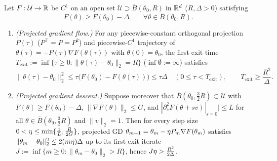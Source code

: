 \begin{lemma}
\label{lem:energy-barrier}
\label{rem:flow}
Let $F : \mathcal U \to \mathbb R$ be $C^1$ on an open set $\mathcal U \supset \bar B(\theta_0, R)$ in $\mathbb R^d$ ($R, \Delta > 0$) satisfying
\[
  F(\theta) \ge F(\theta_0) - \Delta \qquad \forall \theta \in \bar B(\theta_0, R).
\]
\begin{enumerate}[label=(\roman*),leftmargin=*,itemsep=1pt,topsep=2pt]
\item \emph{(Projected gradient flow.)} For any piecewise-constant orthogonal projection $P(\tau)$ ($P^\top = P = P^2$) and piecewise-$C^1$ trajectory of $\dot\theta(\tau) = -P(\tau)\nabla F(\theta(\tau))$ with $\theta(0) = \theta_0$, the first exit time $T_{\mathrm{exit}} := \inf\{\tau \ge 0 : \|\theta(\tau) - \theta_0\|_2 = R\}$ ($\inf\emptyset := \infty$) satisfies
\begin{equation}
  \|\theta(\tau) - \theta_0\|_2^2 \le \tau\bigl(F(\theta_0) - F(\theta(\tau))\bigr) \le \tau\Delta \quad (0 \le \tau < T_{\mathrm{exit}}), \qquad
  T_{\mathrm{exit}} \ge \frac{R^2}{\Delta}.
  \label{eq:energy-barrier}
\end{equation}
\item \emph{(Projected gradient descent.)} Suppose moreover that $\bar B(\theta_0, \frac{3}{2}R) \subset \mathcal U$ with $F(\theta) \ge F(\theta_0) - \Delta$, $\|\nabla F(\theta)\|_2 \le G$, and $|\partial_s^2 F(\theta + sv)|_{s=0}| \le L$ for all $\theta \in \bar B(\theta_0, \frac{3}{2}R)$ and $\|v\|_2 = 1$. Then for every step size $0 < \eta \le \min\{\frac{1}{L}, \frac{R}{2G}\}$, projected GD $\theta_{m+1} = \theta_m - \eta P_m\nabla F(\theta_m)$ satisfies $\|\theta_m - \theta_0\|_2^2 \le 2(m\eta)\Delta$ up to its first exit iterate $J := \inf\{m \ge 0 : \|\theta_m - \theta_0\|_2 > R\}$, hence $J\eta > \frac{R^2}{2\Delta}$.
\end{enumerate}
\end{lemma}
